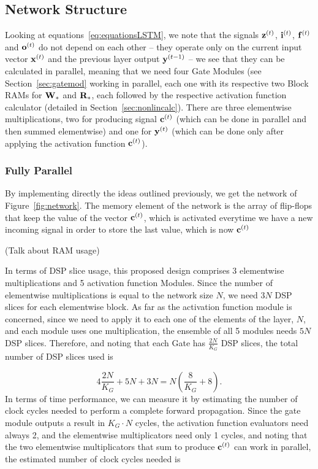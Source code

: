\subsection{Network Structure}\label{sec:hLSTM-struct}
Looking at equations~\ref{eq:equationsLSTM}, we note that the signals $\mathbf{z}^{(t)}$, $\mathbf{i}^{(t)}$, $\mathbf{f}^{(t)}$ and $\mathbf{o}^{(t)}$ do not depend on each other -- they operate only on the current input vector $\mathbf{x}^{(t)}$ and the previous layer output $\mathbf{y}^{(t-1)}$ -- we see that they can be calculated in parallel, meaning that we need four Gate Modules (see Section~\ref{sec:gatemod} working in parallel, each one with its respective two Block RAMs for $\mathbf{W}_*$ and $\mathbf{R}_*$, each followed by the respective activation function calculator (detailed in Section~\ref{sec:nonlincalc}). There are three elementwise multiplications, two for producing signal $\mathbf{c}^{(t)}$ (which can be done in parallel and then summed elementwise) and one for $\mathbf{y}^{(t)}$ (which can be done only after applying the activation function $\mathbf{c}^{(t)}$).

\subsubsection{Fully Parallel}\label{sec:struct-fullpar}
By implementing directly the ideas outlined previously, we get the network of Figure~\ref{fig:network}. The memory element of the network is the array of flip-flops that keep the value of the vector $\mathbf{c}^{(t)}$, which is activated everytime we have a new incoming signal in order to store the last value, which is now $\mathbf{c}^{(t)}$

(Talk about RAM usage)

In terms of DSP slice usage, this proposed design comprises 3 elementwise multiplications and 5 activation function Modules. Since the number of elementwise multiplications is equal to the network size $N$, we need $3N$ DSP slices for each elementwise block. As far as the activation function module is concerned, since we need to apply it to each one of the elements of the layer, $N$, and each module uses one multiplication, the ensemble of all 5 modules needs $5N$ DSP slices. Therefore, and noting that each Gate has $\frac{2N}{K_G}$ DSP slices, the total number of DSP slices used is

\begin{equation}\label{eq:numdsp_network}
    4\frac{2N}{K_G} + 5N + 3N = N \left( \frac{8}{K_G} + 8 \right).
\end{equation}
In terms of time performance, we can measure it by estimating the number of clock cycles needed to perform a complete forward propagation. Since the gate module outputs a result in $K_G \cdot N$ cycles, the activation function evaluators need always 2, and the elementwise multiplicators need only 1 cycles, and noting that the two elementwise multiplicators that sum to produce $\mathbf{c}^{(t)}$ can work in parallel, the estimated number of clock cycles needed is

